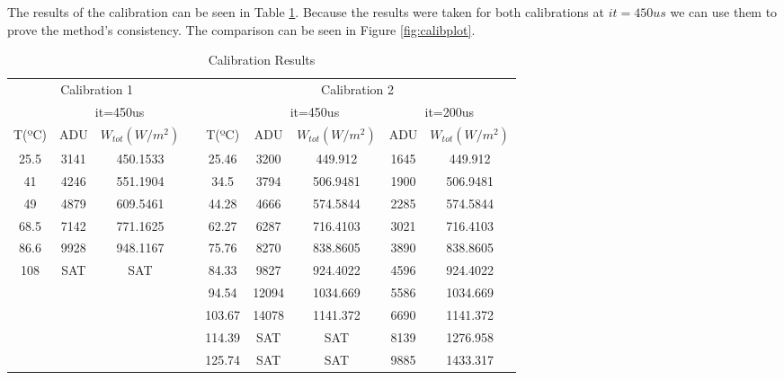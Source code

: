\par The results of the calibration can be seen in Table \ref{tab:calibration}. Because the results were taken for both calibrations at $it=450us$ we can use them to prove the method's consistency. The comparison can be seen in Figure \ref{fig:calibplot}.  \\

\begin{table}[h]
\centering
\caption{Calibration Results}
\label{tab:calibration}
\begin{tabular}{ccccccccc}
\toprule
\multicolumn{3}{c}{Calibration 1}       &  & \multicolumn{5}{c}{Calibration 2}                                    \\ 
\cmidrule[0.4pt](r{0.125em}){1-3}%
\cmidrule[0.4pt](r{0.125em}){5-9}%
         & \multicolumn{2}{c}{it=450us} &  &        & \multicolumn{2}{c}{it=450us} & \multicolumn{2}{c}{it=200us} \\
\cmidrule[0.4pt](r{0.125em}){2-3}%
\cmidrule[0.4pt](r{0.125em}){6-7}%
\cmidrule[0.4pt](r{0.125em}){8-9}%
T(ºC)  & ADU         & $W_{tot}(W/m^2)$      &  & T(ºC)& ADU         & $W_{tot}(W/m^2)$      & ADU         & $W_{tot}(W/m^2)$      \\
\cmidrule[0.4pt](r{0.125em}){1-3}%
\cmidrule[0.4pt](r{0.125em}){5-9}%
25.5     & 3141        & 450.1533       &  & 25.46  & 3200        & 449.912        & 1645        & 449.912        \\
41       & 4246        & 551.1904       &  & 34.5   & 3794        & 506.9481       & 1900        & 506.9481       \\
49       & 4879        & 609.5461       &  & 44.28  & 4666        & 574.5844       & 2285        & 574.5844       \\
68.5     & 7142        & 771.1625       &  & 62.27  & 6287        & 716.4103       & 3021        & 716.4103       \\
86.6     & 9928        & 948.1167       &  & 75.76  & 8270        & 838.8605       & 3890        & 838.8605       \\
108      & SAT         & SAT            &  & 84.33  & 9827        & 924.4022       & 4596        & 924.4022       \\
         &             &                &  & 94.54  & 12094       & 1034.669       & 5586        & 1034.669       \\
         &             &                &  & 103.67 & 14078       & 1141.372       & 6690        & 1141.372       \\
         &             &                &  & 114.39 & SAT         & SAT            & 8139        & 1276.958       \\
         &             &                &  & 125.74 & SAT         & SAT            & 9885        & 1433.317     \\ \bottomrule
\end{tabular}
\end{table}

